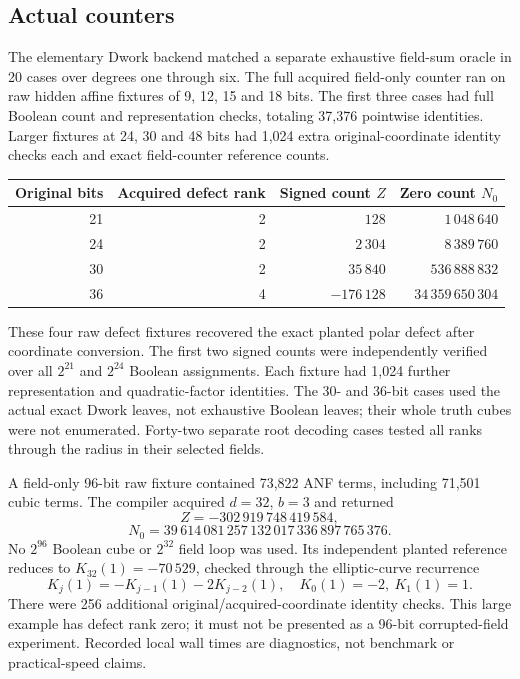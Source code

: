 \documentclass[11pt]{article}
\theoremstyle{remark}\newtheorem{remark}[theorem]{Remark}
\begin{document}
\subsection{Actual counters}
The elementary Dwork backend matched a separate exhaustive field-sum oracle in 20 cases over degrees one through six. The full acquired field-only counter ran on raw hidden affine fixtures of 9, 12, 15 and 18 bits. The first three cases had full Boolean count and representation checks, totaling 37,376 pointwise identities. Larger fixtures at 24, 30 and 48 bits had 1,024 extra original-coordinate identity checks each and exact field-counter reference counts.

\begin{center}
\begin{tabular}{rrrr}
\toprule
Original bits & Acquired defect rank & Signed count $Z$ & Zero count $N_0$\\
\midrule
21 & 2 & $128$ & $1\,048\,640$\\
24 & 2 & $2\,304$ & $8\,389\,760$\\
30 & 2 & $35\,840$ & $536\,888\,832$\\
36 & 4 & $-176\,128$ & $34\,359\,650\,304$\\
\bottomrule
\end{tabular}
\end{center}
These four raw defect fixtures recovered the exact planted polar defect after coordinate conversion. The first two signed counts were independently verified over all $2^{21}$ and $2^{24}$ Boolean assignments. Each fixture had 1,024 further representation and quadratic-factor identities. The 30- and 36-bit cases used the actual exact Dwork leaves, not exhaustive Boolean leaves; their whole truth cubes were not enumerated. Forty-two separate root decoding cases tested all ranks through the radius in their selected fields.

A field-only 96-bit raw fixture contained 73,822 ANF terms, including 71,501 cubic terms. The compiler acquired $d=32$, $b=3$ and returned
\[
 Z=-302\,919\,748\,419\,584,
\]
\[
 N_0=39\,614\,081\,257\,132\,017\,336\,897\,765\,376.
\]
No $2^{96}$ Boolean cube or $2^{32}$ field loop was used. Its independent planted reference reduces to $K_{32}(1)=-70\,529$, checked through the elliptic-curve recurrence
\[
 K_j(1)=-K_{j-1}(1)-2K_{j-2}(1),\quad K_0(1)=-2,\ K_1(1)=1.
\]
There were 256 additional original/acquired-coordinate identity checks. This large example has defect rank zero; it must not be presented as a 96-bit corrupted-field experiment. Recorded local wall times are diagnostics, not benchmark or practical-speed claims.
\end{document}
